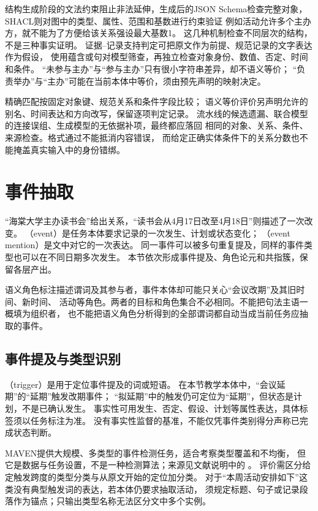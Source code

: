 结构生成阶段的文法约束阻止非法延伸，生成后的JSON Schema检查完整对象，
SHACL则对图中的类型、属性、范围和基数进行约束验证
例如活动允许多个主办方，就不能为了方便给该关系强设最大基数1。
这几种机制检查不同层次的结构，不是三种事实证明。
证据--记录支持判定可把原文作为前提、规范记录的文字表达作为假设，
使用蕴含或句对模型筛查，再独立检查对象身份、数值、否定、时间和条件。
“未参与主办”与“参与主办”只有很小字符串差异，却不语义等价；
“负责举办”与“主办”可能在当前本体中等价，须由预先声明的映射决定。

精确匹配按固定对象键、规范关系和条件字段比较；
语义等价评价另声明允许的别名、时间表达和方向改写，保留逐项判定记录。
流水线的候选遗漏、联合模型的连接误组、生成模型的无依据补项，最终都应落回
相同的对象、关系、条件、来源检查。格式通过不能抵消内容错误，
而给定正确实体条件下的关系分数也不能掩盖真实输入中的身份错绑。

\section{事件抽取}
\label{sec:nlp-extraction-events}

“海棠大学主办读书会”给出关系，“读书会从4月17日改至4月18日”则描述了一次改变。
（event）是任务本体要求记录的一次发生、计划或状态变化；
（event mention）是文中对它的一次表达。
同一事件可以被多句重复提及，同样的事件类型也可以在不同日期多次发生。
本节依次形成事件提及、角色论元和共指簇，保留各层产出。

语义角色标注描述谓词及其参与者，事件本体却可能只关心“会议改期”及其旧时间、新时间、
活动等角色。两者的目标和角色集合不必相同。不能把句法主语一概填为组织者，
也不能把语义角色分析得到的全部谓词都自动当成当前任务应抽取的事件。

\subsection{事件提及与类型识别}
\label{sec:nlp-extraction-event-detection}

（trigger）是用于定位事件提及的词或短语。
在本节教学本体中，“会议延期”的“延期”触发改期事件；
“拟延期”中的触发仍可定位为“延期”，但状态是计划，不是已确认发生。
事实性可用发生、否定、假设、计划等属性表达，具体标签须以任务标注为准。
没有事实性监督的基准，不能仅凭事件类别得分声称已完成状态判断。

MAVEN提供大规模、多类型的事件检测任务，适合考察类型覆盖和不均衡，
但它是数据与任务设置，不是一种检测算法；来源见文献说明中的
。
评价需区分给定触发跨度的类型分类与从原文开始的定位加分类。
对于“本周活动安排如下”这类没有典型触发词的表达，若本体仍要求抽取活动，
须规定标题、句子或记录段落作为锚点；只输出类型名称无法区分文中多个实例。

